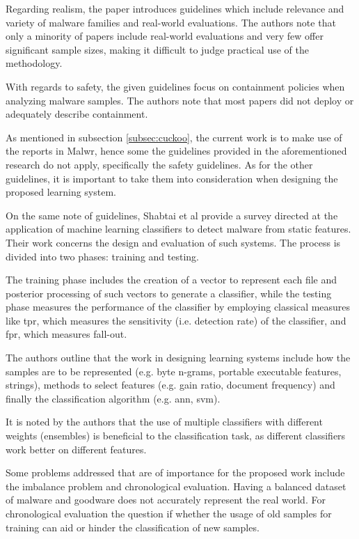 Regarding realism, the paper introduces guidelines which include relevance and variety of malware families and real-world evaluations. The authors note that only a minority of papers include real-world evaluations and very few offer significant sample sizes, making it difficult to judge practical use of the methodology.

With regards to safety, the given guidelines focus on containment policies when analyzing malware samples. The authors note that most papers did not deploy or adequately describe containment.

As mentioned in subsection \ref{subsec:cuckoo}, the current work is to make use of the reports in Malwr, hence some the guidelines provided in the aforementioned research do not apply, specifically the safety guidelines. As for the other guidelines, it is important to take them into consideration when designing the proposed learning system.

On the same note of guidelines, Shabtai et al\cite{shabtai:survey} provide a survey directed at the application of machine learning classifiers to detect malware from static features. Their work concerns the design and evaluation of such systems. The process is divided into two phases: training and testing.

The training phase includes the creation of a vector to represent each file and posterior processing of such vectors to generate a classifier, while the testing phase measures the performance of the classifier by employing classical measures like \gls{tpr}, which measures the sensitivity (i.e. detection rate) of the classifier, and \gls{fpr}, which measures fall-out.

The authors outline that the work in designing learning systems include how the samples are to be represented (e.g. byte n-grams, portable executable features, strings), methods to select features (e.g. gain ratio, document frequency) and finally the classification algorithm (e.g. \gls{ann}, \gls{svm}).

It is noted by the authors that the use of multiple classifiers with different weights (ensembles) is beneficial to the classification task, as different classifiers work better on different features.

Some problems addressed that are of importance for the proposed work include the imbalance problem and chronological evaluation. Having a balanced dataset of malware and goodware does not accurately represent the real world. For chronological evaluation the question if whether the usage of old samples for training can aid or hinder the classification of new samples.

